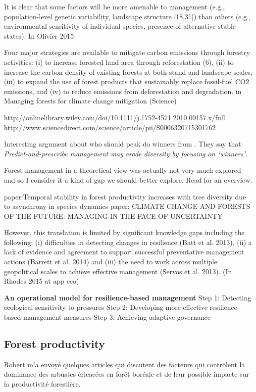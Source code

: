 It is clear that some factors will be more amenable to management (e.g., population-level genetic variability, landscape structure
[18,31]) than others (e.g., environmental sensitivity of individual species, presence of alternative stable states). In Olivier 2015

Four major strategies are available to mitigate carbon emissions through forestry activities: (i) to increase forested land area through reforestation (6), (ii) to increase the carbon density of existing forests at both stand and landscape scales, (iii) to expand the use of forest products that sustainably replace fossil-fuel CO2 emissions, and (iv) to reduce emissions from deforestation and degradation. in Managing forests for climate change mitigation (Science)

http://onlinelibrary.wiley.com/doi/10.1111/j.1752-4571.2010.00157.x/full \\
http://www.sciencedirect.com/science/article/pii/S0006320715301762

Interesting argument about who should peak do winners from \textcite{Webster2017}. They say that \textit{Predict-and-prescribe management may erode diversity by focusing on ‘winners’}.

Forest management in a theoretical view was actually not very much explored and so I consider it a kind of gap we should better explore. Read \textcite{Becknell2015} for an overview.

paper:Temporal stability in forest productivity increases with tree diversity due to asynchrony in species dynamics
paper: CLIMATE CHANGE AND FORESTS OF THE FUTURE: MANAGING IN THE FACE OF UNCERTAINTY

However, this translation is limited by significant knowledge gaps including the following: (i) difficulties in detecting changes in resilience (Batt et al. 2013), (ii) a lack of evidence and agreement to support successful preventative management actions (Barrett et al. 2014) and (iii) the need to work across multiple geopolitical scales to achieve effective management (Servos et al. 2013). (In Rhodes 2015 at app eco)

\textbf{An operational model for resilience-based management}
Step 1: Detecting ecological sensitivity to pressures
Step 2: Developing more effective resilience-based management measures
Step 3: Achieving adaptive governance

\subsection{Forest productivity}
Robert m'a envoyé quelques articles qui discutent des facteurs qui contrôlent la dominance des arbustes éricacées en forêt boréale et de leur possible impacte sur la productivité forestière.

